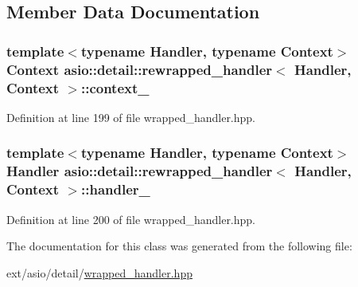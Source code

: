 \subsection{Member Data Documentation}
\hypertarget{classasio_1_1detail_1_1rewrapped__handler_aa4d5ba2fb7339e10ce2092b9cd38c705}{}
\subsubsection[{context\+\_\+}]{\setlength{\rightskip}{0pt plus 5cm}template$<$typename Handler, typename Context$>$ Context {\bf asio\+::detail\+::rewrapped\+\_\+handler}$<$ Handler, Context $>$\+::context\+\_\+}\label{classasio_1_1detail_1_1rewrapped__handler_aa4d5ba2fb7339e10ce2092b9cd38c705}


Definition at line 199 of file wrapped\+\_\+handler.\+hpp.

\hypertarget{classasio_1_1detail_1_1rewrapped__handler_aaa272366eec7b6ab446361ab4e4323e9}{}
\subsubsection[{handler\+\_\+}]{\setlength{\rightskip}{0pt plus 5cm}template$<$typename Handler, typename Context$>$ Handler {\bf asio\+::detail\+::rewrapped\+\_\+handler}$<$ Handler, Context $>$\+::handler\+\_\+}\label{classasio_1_1detail_1_1rewrapped__handler_aaa272366eec7b6ab446361ab4e4323e9}


Definition at line 200 of file wrapped\+\_\+handler.\+hpp.



The documentation for this class was generated from the following file\+:\begin{DoxyCompactItemize}
\item 
ext/asio/detail/\hyperlink{wrapped__handler_8hpp}{wrapped\+\_\+handler.\+hpp}\end{DoxyCompactItemize}
